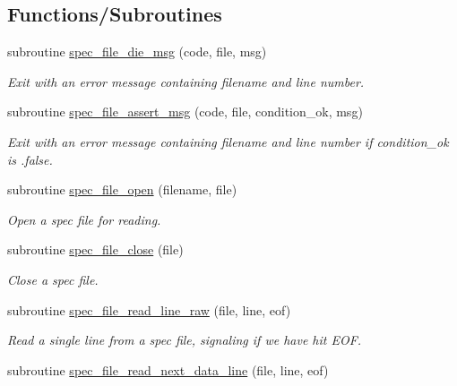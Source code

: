 \subsection*{Functions/\+Subroutines}
\begin{DoxyCompactItemize}
\item 
subroutine \mbox{\hyperlink{namespacepmc__spec__file_ac24abec0f3c3e539debe886ddc775e1e}{spec\+\_\+file\+\_\+die\+\_\+msg}} (code, file, msg)
\begin{DoxyCompactList}\small\item\em Exit with an error message containing filename and line number. \end{DoxyCompactList}\item 
subroutine \mbox{\hyperlink{namespacepmc__spec__file_a5aa135a96d6a58a77a3b662942666146}{spec\+\_\+file\+\_\+assert\+\_\+msg}} (code, file, condition\+\_\+ok, msg)
\begin{DoxyCompactList}\small\item\em Exit with an error message containing filename and line number if {\ttfamily condition\+\_\+ok} is {\ttfamily }.false. \end{DoxyCompactList}\item 
subroutine \mbox{\hyperlink{namespacepmc__spec__file_a43c0fc75a0548567dae0812159a0288e}{spec\+\_\+file\+\_\+open}} (filename, file)
\begin{DoxyCompactList}\small\item\em Open a spec file for reading. \end{DoxyCompactList}\item 
subroutine \mbox{\hyperlink{namespacepmc__spec__file_a430ebeed3523661d0f5bc18d682c1cc5}{spec\+\_\+file\+\_\+close}} (file)
\begin{DoxyCompactList}\small\item\em Close a spec file. \end{DoxyCompactList}\item 
subroutine \mbox{\hyperlink{namespacepmc__spec__file_a1225f44ce38aaf0343dd74cf7435770a}{spec\+\_\+file\+\_\+read\+\_\+line\+\_\+raw}} (file, line, eof)
\begin{DoxyCompactList}\small\item\em Read a single line from a spec file, signaling if we have hit E\+OF. \end{DoxyCompactList}\item 
subroutine \mbox{\hyperlink{namespacepmc__spec__file_a01c2274e2a58d5b7a83d3997d36742d6}{spec\+\_\+file\+\_\+read\+\_\+next\+\_\+data\+\_\+line}} (file, line, eof)

\end{DoxyCompactItemize}
